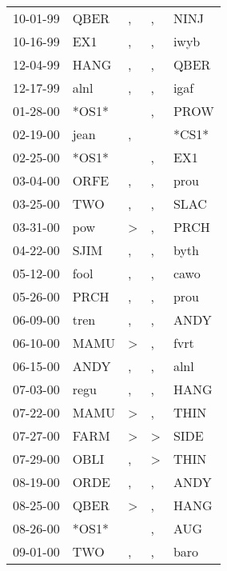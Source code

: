 \begin{supertabular}{lllll}
 10-01-99 &   QBER &                , &                , &   NINJ \\
 10-16-99 &    EX1 &                , &                , &   iwyb \\
 12-04-99 &   HANG &                , &                , &   QBER \\
 12-17-99 &   alnl &                , &                , &   igaf \\
 01-28-00 &  *OS1* &                  &                , &   PROW \\
 02-19-00 &   jean &                , &                  &  *CS1* \\
 02-25-00 &  *OS1* &                  &                , &    EX1 \\
 03-04-00 &   ORFE &                , &                , &   prou \\
 03-25-00 &    TWO &                , &                , &   SLAC \\
 03-31-00 &    pow &     \textgreater &                , &   PRCH \\
 04-22-00 &   SJIM &                , &                , &   byth \\
 05-12-00 &   fool &                , &                , &   cawo \\
 05-26-00 &   PRCH &                , &                , &   prou \\
 06-09-00 &   tren &                , &                , &   ANDY \\
 06-10-00 &   MAMU &     \textgreater &                , &   fvrt \\
 06-15-00 &   ANDY &                , &                , &   alnl \\
 07-03-00 &   regu &                , &                , &   HANG \\
 07-22-00 &   MAMU &     \textgreater &                , &   THIN \\
 07-27-00 &   FARM &     \textgreater &     \textgreater &   SIDE \\
 07-29-00 &   OBLI &                , &     \textgreater &   THIN \\
 08-19-00 &   ORDE &                , &                , &   ANDY \\
 08-25-00 &   QBER &     \textgreater &                , &   HANG \\
 08-26-00 &  *OS1* &                  &                , &    AUG \\
 09-01-00 &    TWO &                , &                , &   baro \\

\end{supertabular}
